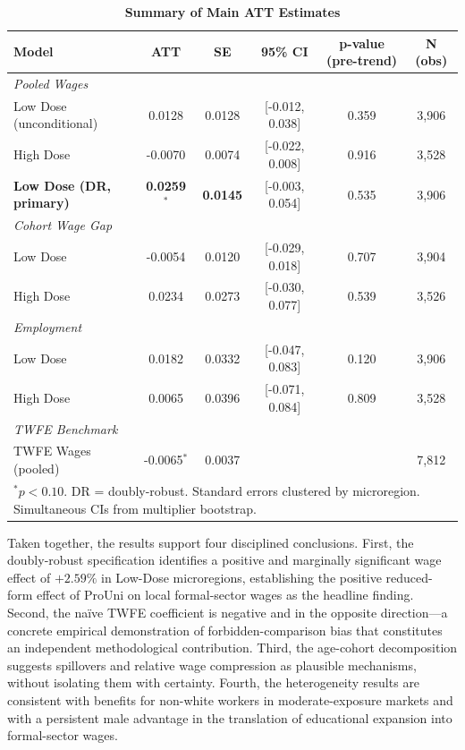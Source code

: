 \begin{table}[ht]
\centering
\caption{\textbf{Summary of Main ATT Estimates}}
\label{tab:master_summary}
\begin{tabular}{lccccc}
\hline
\textbf{Model} & \textbf{ATT} & \textbf{SE} & \textbf{95\% CI} & \textbf{p-value (pre-trend)} & \textbf{N (obs)} \\
\hline
\textit{Pooled Wages} & & & & & \\
Low Dose (unconditional) & 0.0128 & 0.0128 & [-0.012, 0.038] & 0.359 & 3,906 \\
High Dose & -0.0070 & 0.0074 & [-0.022, 0.008] & 0.916 & 3,528 \\
\textbf{Low Dose (DR, primary)} & \textbf{0.0259}$^{*}$ & \textbf{0.0145} & [-0.003, 0.054] & 0.535 & 3,906 \\
\hline
\textit{Cohort Wage Gap} & & & & & \\
Low Dose & -0.0054 & 0.0120 & [-0.029, 0.018] & 0.707 & 3,904 \\
High Dose & 0.0234 & 0.0273 & [-0.030, 0.077] & 0.539 & 3,526 \\
\hline
\textit{Employment} & & & & & \\
Low Dose & 0.0182 & 0.0332 & [-0.047, 0.083] & 0.120 & 3,906 \\
High Dose & 0.0065 & 0.0396 & [-0.071, 0.084] & 0.809 & 3,528 \\
\hline
\textit{TWFE Benchmark} & & & & & \\
TWFE Wages (pooled) & -0.0065$^{*}$ & 0.0037 & & & 7,812 \\
\hline
\multicolumn{6}{l}{\small $^{*} p<0.10$. DR = doubly-robust. Standard errors clustered by microregion. Simultaneous CIs from multiplier bootstrap.}
\end{tabular}
\end{table}

Taken together, the results support four disciplined conclusions. First, the doubly-robust specification identifies a positive and marginally significant wage effect of $+2.59\%$ in Low-Dose microregions, establishing the positive reduced-form effect of ProUni on local formal-sector wages as the headline finding. Second, the na\"ive TWFE coefficient is negative and in the opposite direction---a concrete empirical demonstration of forbidden-comparison bias that constitutes an independent methodological contribution. Third, the age-cohort decomposition suggests spillovers and relative wage compression as plausible mechanisms, without isolating them with certainty. Fourth, the heterogeneity results are consistent with benefits for non-white workers in moderate-exposure markets and with a persistent male advantage in the translation of educational expansion into formal-sector wages.
